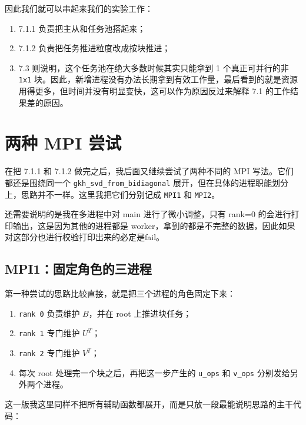\documentclass[12pt,a4paper,fontset=none]{ctexart}
\begin{document}
 因此我们就可以串起来我们的实验工作：
\begin{enumerate}
    \item 7.1.1 负责把主从和任务池搭起来；
    \item 7.1.2 负责把任务推进粒度改成按块推进；
    \item 7.3 则说明，这个任务池在绝大多数时候其实只能拿到 1 个真正可并行的非
          \texttt{1x1} 块。因此，新增进程没有办法长期拿到有效工作量，最后看到的就是资源用得更多，但时间并没有明显变快，这可以作为原因反过来解释 7.1 的工作结果差的原因。
\end{enumerate}

\section{两种 MPI 尝试}

在把 7.1.1 和 7.1.2 做完之后，我后面又继续尝试了两种不同的 MPI 写法。它们都还是围绕同一个
\texttt{gkh\_svd\_from\_bidiagonal} 展开，但在具体的进程职能划分上，思路并不一样。这里我把它们分别记成 \texttt{MPI1} 和 \texttt{MPI2}。

还需要说明的是我在多进程中对 main 进行了微小调整，只有 rank=0 的会进行打印输出，这是因为其他的进程都是 worker，拿到的都是不完整的数据，因此如果对这部分也进行校验打印出来的必定是fail。

\subsection*{MPI1：固定角色的三进程}

第一种尝试的思路比较直接，就是把三个进程的角色固定下来：
\begin{enumerate}
    \item \texttt{rank 0} 负责维护 \(B\)，并在 root 上推进块任务；
    \item \texttt{rank 1} 专门维护 \(U^T\)；
    \item \texttt{rank 2} 专门维护 \(V^T\)；
    \item 每次 root 处理完一个块之后，再把这一步产生的 \texttt{u\_ops} 和 \texttt{v\_ops} 分别发给另外两个进程。
\end{enumerate}

这一版我这里同样不把所有辅助函数都展开，而是只放一段最能说明思路的主干代码：
\end{document}

